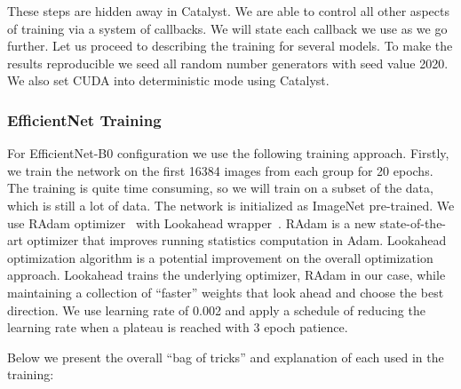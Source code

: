 \documentclass[letterpaper]{article}
\begin{document}
These steps are hidden away in Catalyst. We are able to control all other aspects of training via a system of callbacks. We will state each callback we use as we go further. Let us proceed to describing the training for several models. To make the results reproducible we seed all random number generators with seed value 2020. We also set CUDA into deterministic mode using Catalyst.

\subsubsection{EfficientNet Training}

For EfficientNet-B0 configuration we use the following training approach. Firstly, we train the network on the first 16384 images from each group for 20 epochs. The training is quite time consuming, so we will train on a subset of the data, which is still a lot of data. The network is initialized as ImageNet pre-trained. We use RAdam optimizer~\cite{liu2019variance} with Lookahead wrapper~\cite{zhang2019lookahead}. RAdam is a new state-of-the-art optimizer that improves running statistics computation in Adam. Lookahead optimization algorithm is a potential improvement on the overall optimization approach. Lookahead trains the underlying optimizer, RAdam in our case, while maintaining a collection of ``faster'' weights that look ahead and choose the best direction. We use learning rate of  0.002 and apply a schedule of reducing the learning rate when a plateau is reached with 3 epoch patience.

Below we present the overall ``bag of tricks'' and explanation of each used in the training:
\end{document}
